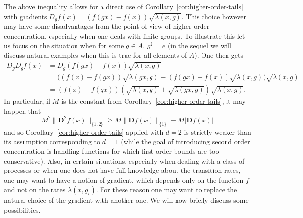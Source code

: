 \documentclass[a4paper]{amsart}
\theoremstyle{definition}
\theoremstyle{remark}
\numberwithin{equation}{section}
\begin{document}
The above inequality allows for a direct use of Corollary~\ref{cor:higher-order-tails} with gradients $D_g f(x)= (f(gx) - f(x))\sqrt{\lambda(x,g)}$. This  choice however may have some disadvantages from the point of view of higher order concentration, especially when one deals with finite groups. To illustrate this let us focus on the situation when for some $g \in A$, $g^2 = e$ (in the sequel we will discuss natural examples when this is true for all elements of $A$). One then gets
\begin{align*}
D_{g}D_{g} f(x) &= D_{g} (f(gx) - f(x))\sqrt{\lambda(x,g)}\\
&= \bigl((f(x) - f(gx))\sqrt{\lambda(gx,g)}  - (f(gx) - f(x))\sqrt{\lambda(x,g)}\bigr)\sqrt{\lambda(x,g)} \\
&= (f(x) - f(gx))(\sqrt{\lambda(x,g)}+\sqrt{\lambda(gx,g)})\sqrt{\lambda(x,g)}.
\end{align*}
In particular, if $M$ is the constant from Corollary~\ref{cor:higher-order-tails}, it may happen that
\begin{displaymath}
  M^2\|\mathbf{D}^2 f(x)\|_{\{1,2\}} \ge M \|\mathbf{D} f(x)\|_{\{1\}} = M|\mathbf{D} f(x)|
\end{displaymath}
and so Corollary~\ref{cor:higher-order-tails} applied with $d=2$ is strictly weaker than its assumption corresponding to $d=1$ (while the goal of introducing second order concentration is handling functions for which first order bounds are too conservative). Also, in certain situations, especially when dealing with a class of processes or when one does not have full knowledge about the transition rates, one may want to have a notion of gradient, which depends only on the function $f$ and not on the rates $\lambda(x,g_i)$.  For these reason one may want to replace the natural choice of the gradient with another one. We will now briefly discuss some possibilities.
\end{document}
